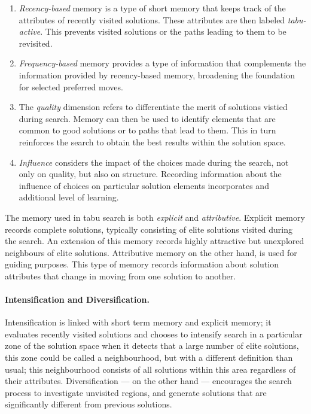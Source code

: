 \begin{enumerate}
\item \emph{Recency-based} memory is a type of short memory that keeps track of the attributes of recently visited solutions. These attributes are then labeled \emph{tabu-active}. This prevents visited solutions or the paths leading to them to be revisited.
\item \emph{Frequency-based} memory provides a type of information that complements the information provided by recency-based memory, broadening the foundation for selected preferred moves.
\item The \emph{quality} dimension refers to differentiate the merit of solutions vistied during search. Memory can then be used to identify elements that are common to good solutions or to paths that lead to them. This in turn reinforces the search to obtain the best results within the solution space.  
\item \emph{Influence} considers the impact of the choices made during the search, not only on quality, but also on structure. Recording information about the influence of choices on particular solution elements incorporates and additional level of learning.
\end{enumerate}

The memory used in tabu search is both \emph{explicit} and \emph{attributive}. Explicit memory records complete solutions, typically consisting of elite solutions visited during the search. An extension of this memory records highly attractive but unexplored neighbours of elite solutions. Attributive memory on the other hand, is used for guiding purposes. This type of memory records information about solution attributes that change in moving from one solution to another.

\paragraph{Intensification and Diversification.} Intensification is linked with short term memory and explicit memory; it evaluates recently visited solutions and chooses to intensify search in a particular zone of the solution space when it detects that a large number of elite solutions, this zone could be called a neighbourhood, but with a different definition than usual; this neighbourhood consists of all solutions within this area regardless of their attributes. Diversification --- on the other hand --- encourages the search process to investigate unvisited regions, and generate solutions that are significantly different from previous solutions.

